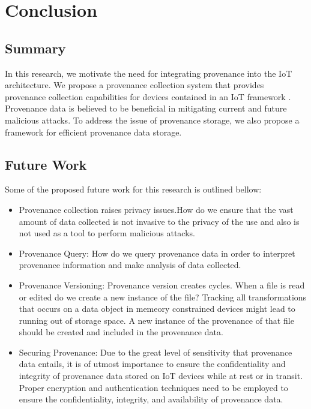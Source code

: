 
\chapter{Conclusion}

\section{Summary}
In this research, we motivate the need for integrating provenance into the IoT architecture. We propose a provenance collection system that provides provenance collection capabilities for devices contained in an IoT framework . Provenance data is believed to be beneficial in mitigating current and future malicious attacks. To address the issue of provenance storage, we also propose a framework for efficient provenance data storage.

\section{Future Work}

Some of the proposed future work for this research is outlined bellow:
\begin{itemize}

\item Provenance collection raises privacy issues.How do we ensure that the vast amount of data collected is not invasive to the privacy of the use and also is not used as a tool to perform malicious attacks.

\item Provenance Query: How do we query provenance data in order to interpret provenance information and make analysis of data collected.

\item Provenance Versioning: Provenance version creates cycles. When a file is read or edited do we create a new instance of the file? Tracking all transformations that occurs on a data object in memeory constrained devices might lead to running out of storage space. A new instance of the provenance of that file should be created and included in the provenance data.

\item Securing Provenance: Due to the great level of sensitivity that  provenance data entails, it is of utmost importance to ensure the confidentiality and integrity of provenance data stored on IoT devices while at rest or in transit. Proper encryption and authentication techniques need to be employed to ensure the confidentiality, integrity, and availability of provenance data.

\end{itemize}

